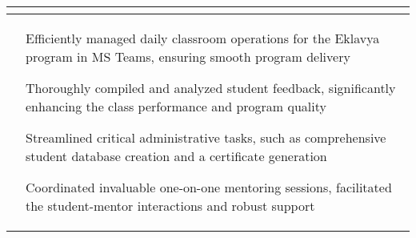 \documentclass[10pt]{extarticle}
\begin{document}
{\begin{flushleft}
\begin{center}
\begin{tabularx}{\textwidth}{ p{1.7cm} | X }
\begin{tabitemize}
\end{tabitemize}\\
\hline
\centering\multirow{1}{*}{\textbf{Approach}} & 
\begin{tabitemize}
    \item Efficiently managed daily classroom operations for the Eklavya program in MS Teams, ensuring smooth program delivery  
    \item Thoroughly compiled and analyzed student feedback, significantly enhancing the class performance and program quality
    \item Streamlined critical administrative tasks, such as comprehensive student database creation and a certificate generation
    \item Coordinated invaluable one-on-one mentoring sessions, facilitated the student-mentor interactions and robust support
\end{tabitemize}\\


\end{tabularx}
\end{center}
\end{flushleft}}
\end{document}
